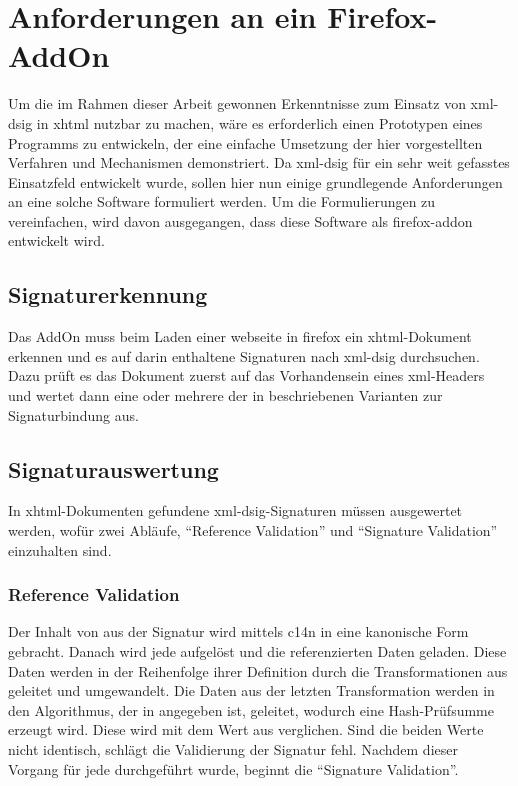 
\chapter{Anforderungen an ein Firefox-AddOn}
\label{chap:Anforderungen}
Um die im Rahmen dieser Arbeit gewonnen Erkenntnisse zum Einsatz von \gls{xml-dsig} in \gls{xhtml} nutzbar zu machen, wäre es erforderlich einen Prototypen
eines Programms zu entwickeln, der eine einfache Umsetzung der hier vorgestellten Verfahren und Mechanismen demonstriert. Da \gls{xml-dsig} für ein sehr weit
gefasstes Einsatzfeld entwickelt wurde, sollen hier nun einige grundlegende Anforderungen an eine solche Software formuliert werden. Um die Formulierungen zu
vereinfachen, wird davon ausgegangen, dass diese Software als \gls{firefox-addon} entwickelt wird.

\section{Signaturerkennung}
\label{sec:Anforderungen:Signaturerkennung}
Das AddOn muss beim Laden einer \gls{webseite} in \gls{firefox} ein \gls{xhtml}-Dokument erkennen und es auf darin enthaltene Signaturen nach \gls{xml-dsig}
durchsuchen. Dazu prüft es das Dokument zuerst auf das Vorhandensein eines \gls{xml}-Headers und wertet dann eine oder mehrere der in
 beschriebenen Varianten zur Signaturbindung aus.

\section{Signaturauswertung}
\label{sec:Anforderungen:Signaturauswertung}
In \gls{xhtml}-Dokumenten gefundene \gls{xml-dsig}-Signaturen müssen ausgewertet werden, wofür zwei Abläufe, "`Reference Validation"' und "`Signature
Validation"' einzuhalten sind.

\subsection{Reference Validation}
Der Inhalt von  aus der Signatur wird mittels \gls{c14n} in eine kanonische Form gebracht. Danach wird jede  aufgelöst
und die referenzierten Daten geladen. Diese Daten werden in der Reihenfolge ihrer Definition durch die Transformationen aus  geleitet und
umgewandelt. Die Daten aus der letzten Transformation werden in den Algorithmus, der in  angegeben ist, geleitet, wodurch eine
Hash-Prüfsumme erzeugt wird. Diese wird mit dem Wert aus  verglichen. Sind die beiden Werte nicht identisch, schlägt die Validierung der
Signatur fehl. Nachdem dieser Vorgang für jede  durchgeführt wurde, beginnt die "`Signature Validation"'.

